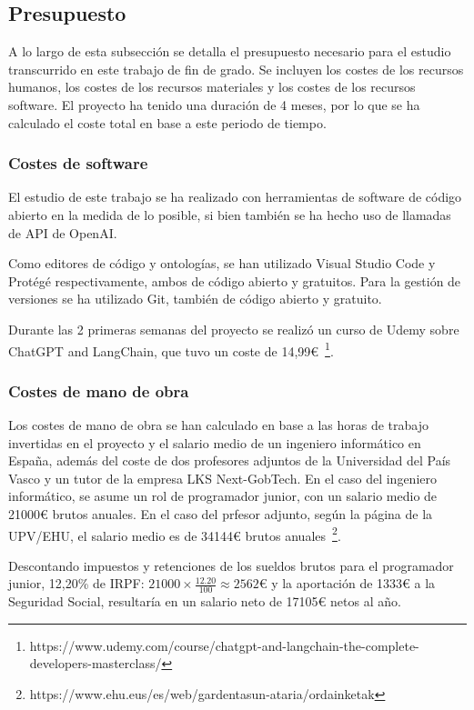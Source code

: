\subsection{Presupuesto}
A lo largo de esta subsección se detalla el presupuesto necesario para el estudio transcurrido en este trabajo de fin de grado. Se incluyen los costes de los recursos humanos, los costes de los recursos materiales y los costes de los recursos software. El proyecto ha tenido una duración de 4 meses, por lo que se ha calculado el coste total en base a este periodo de tiempo.

\subsubsection{Costes de software}
El estudio de este trabajo se ha realizado con herramientas de software de código abierto en la medida de lo posible, si bien también se ha hecho uso de llamadas de API de OpenAI.

Como editores de código y ontologías, se han utilizado Visual Studio Code y Protégé respectivamente, ambos de código abierto y gratuitos. Para la gestión de versiones se ha utilizado Git, también de código abierto y gratuito.

Durante las 2 primeras semanas del proyecto se realizó un curso de Udemy sobre ChatGPT and LangChain, que tuvo un coste de 14,99€~\footnote{https://www.udemy.com/course/chatgpt-and-langchain-the-complete-developers-masterclass/}.


\subsubsection{Costes de mano de obra}
Los costes de mano de obra se han calculado en base a las horas de trabajo invertidas en el proyecto y el salario medio de un ingeniero informático en España, además del coste de dos profesores adjuntos de la Universidad del País Vasco y un tutor de la empresa LKS Next-GobTech.
En el caso del ingeniero informático, se asume un rol de programador junior, con un salario medio de 21000€ brutos anuales. 
En el caso del prfesor adjunto, según la página de la UPV/EHU, el salario medio es de 34144€ brutos anuales~\footnote{https://www.ehu.eus/es/web/gardentasun-ataria/ordainketak}. 

Descontando impuestos y retenciones de los sueldos brutos para el programador junior, 12,20\% de IRPF: \(21000 \times \frac{12.20}{100} \approx 2562\)€ y la aportación de 1333€ a la Seguridad Social, resultaría en un salario neto de 17105€ netos al año.

